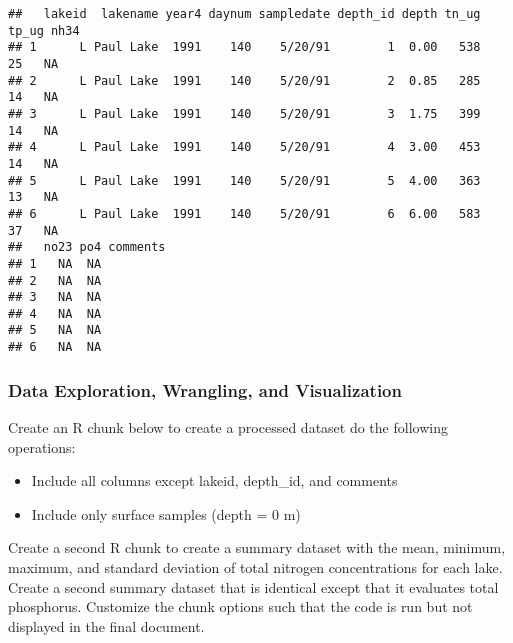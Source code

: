\documentclass[]{article}
\newenvironment{Shaded}{\begin{snugshade}}{\end{snugshade}}
\newcommand{\KeywordTok}[1]{\textcolor[rgb]{0.13,0.29,0.53}{\textbf{#1}}}
\newcommand{\DecValTok}[1]{\textcolor[rgb]{0.00,0.00,0.81}{#1}}
\newcommand{\StringTok}[1]{\textcolor[rgb]{0.31,0.60,0.02}{#1}}
\newcommand{\OperatorTok}[1]{\textcolor[rgb]{0.81,0.36,0.00}{\textbf{#1}}}
\newcommand{\NormalTok}[1]{#1}
\providecommand{\tightlist}{%
  \setlength{\itemsep}{0pt}\setlength{\parskip}{0pt}}
\begin{document}
\begin{verbatim}
##   lakeid  lakename year4 daynum sampledate depth_id depth tn_ug tp_ug nh34
## 1      L Paul Lake  1991    140    5/20/91        1  0.00   538    25   NA
## 2      L Paul Lake  1991    140    5/20/91        2  0.85   285    14   NA
## 3      L Paul Lake  1991    140    5/20/91        3  1.75   399    14   NA
## 4      L Paul Lake  1991    140    5/20/91        4  3.00   453    14   NA
## 5      L Paul Lake  1991    140    5/20/91        5  4.00   363    13   NA
## 6      L Paul Lake  1991    140    5/20/91        6  6.00   583    37   NA
##   no23 po4 comments
## 1   NA  NA         
## 2   NA  NA         
## 3   NA  NA         
## 4   NA  NA         
## 5   NA  NA         
## 6   NA  NA
\end{verbatim}

\subsubsection{Data Exploration, Wrangling, and
Visualization}\label{data-exploration-wrangling-and-visualization}

Create an R chunk below to create a processed dataset do the following
operations:

\begin{itemize}
\tightlist
\item
  Include all columns except lakeid, depth\_id, and comments
\item
  Include only surface samples (depth = 0 m)
\end{itemize}

\begin{Shaded}
\end{Shaded}

Create a second R chunk to create a summary dataset with the mean,
minimum, maximum, and standard deviation of total nitrogen
concentrations for each lake. Create a second summary dataset that is
identical except that it evaluates total phosphorus. Customize the chunk
options such that the code is run but not displayed in the final
document.
\end{document}
